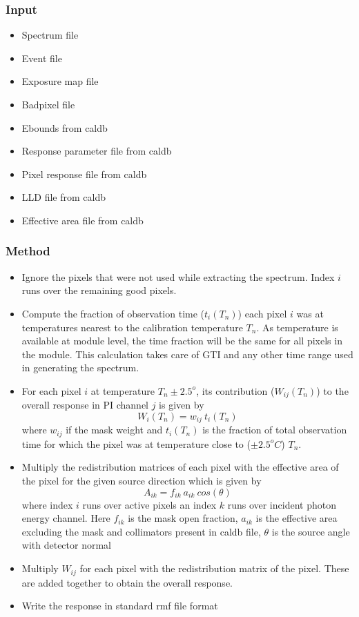 \documentclass[11pt,oneside,a4paper]{article}
\begin{document}
\subsubsection*{Input}
\renewcommand\labelitemi{{\boldmath$\cdot$}}
\begin{itemize}
\item{Spectrum file}
\item{Event file}
\item{Exposure map file}
\item{Badpixel file}
\item{Ebounds from caldb}
\item{Response parameter file from caldb}
\item{Pixel response file from caldb}
\item{LLD file from caldb}
\item{Effective area file from caldb}
\end{itemize}
\subsubsection*{Method}
\begin{itemize}
\item{Ignore the pixels that were not used while extracting the spectrum. Index $i$ runs over the remaining
good pixels.}
\item{Compute the fraction of observation time ($t_i(T_n)$) each pixel $i$ was at temperatures nearest to the calibration
temperature $T_n$. As temperature is available at module level, the time fraction will be the same for all pixels in the module.
This calculation takes care of GTI and any other time range used in generating the spectrum.}
\item{For each pixel $i$ at temperature $T_n \pm 2.5^o $, its contribution ($W_{ij}(T_n)$) to the overall response 
in PI channel $j$ is given by 
$$W_i(T_n) = w_{ij} ~t_i(T_n)$$ 
where $w_{ij}$ if the mask weight and
  $t_i(T_n)$ is the fraction of total observation time for which the pixel was at temperature close to ($\pm2.5^o C$) $T_n$.
 }
\item{Multiply the redistribution matrices of each pixel with the effective area of the pixel for the given source direction which 
is given by
$$A_{ik} = f_{ik}~a_{ik}~cos(\theta)$$
where  index $i$ runs over active pixels an index $k$ runs over incident photon energy channel. 
Here $f_{ik}$ is the mask open fraction, $a_{ik}$ is the effective area excluding the 
mask and collimators present in caldb file, $\theta$ is the source angle with detector normal}
\item{Multiply $W_{ij}$ for each pixel with the redistribution
matrix of the pixel. These are added together to obtain the overall response.}
\item{Write the response in standard rmf file format}
\end{itemize}
\end{document}

